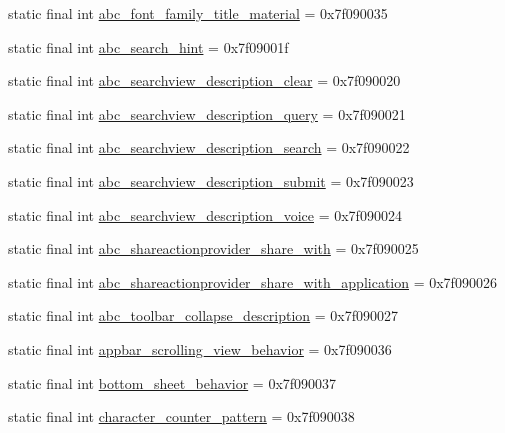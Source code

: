 \begin{CompactItemize}
\item 
static final int \hyperlink{classandroid_1_1support_1_1v4_1_1_r_1_1string_74faea8a3573e3fef71f5c119ca979ed}{abc\_\-font\_\-family\_\-title\_\-material} = 0x7f090035
\item 
static final int \hyperlink{classandroid_1_1support_1_1v4_1_1_r_1_1string_7c13299453796662989c24ebdd24002c}{abc\_\-search\_\-hint} = 0x7f09001f
\item 
static final int \hyperlink{classandroid_1_1support_1_1v4_1_1_r_1_1string_81c15c30d997ffada9693d56bdc9ca25}{abc\_\-searchview\_\-description\_\-clear} = 0x7f090020
\item 
static final int \hyperlink{classandroid_1_1support_1_1v4_1_1_r_1_1string_6de5d06d238b7fbbb99078aa9060dca0}{abc\_\-searchview\_\-description\_\-query} = 0x7f090021
\item 
static final int \hyperlink{classandroid_1_1support_1_1v4_1_1_r_1_1string_a2afff32c707ca74b2a985d2854c03b0}{abc\_\-searchview\_\-description\_\-search} = 0x7f090022
\item 
static final int \hyperlink{classandroid_1_1support_1_1v4_1_1_r_1_1string_6dd2ef27f2821ec61a831f708408d1b6}{abc\_\-searchview\_\-description\_\-submit} = 0x7f090023
\item 
static final int \hyperlink{classandroid_1_1support_1_1v4_1_1_r_1_1string_c7e3b9409a3b8e7f65dfb47fceb61cab}{abc\_\-searchview\_\-description\_\-voice} = 0x7f090024
\item 
static final int \hyperlink{classandroid_1_1support_1_1v4_1_1_r_1_1string_a91cc0a509815b7617ec57dba996e48a}{abc\_\-shareactionprovider\_\-share\_\-with} = 0x7f090025
\item 
static final int \hyperlink{classandroid_1_1support_1_1v4_1_1_r_1_1string_153823e147a2c9ec837d5109d7800f9d}{abc\_\-shareactionprovider\_\-share\_\-with\_\-application} = 0x7f090026
\item 
static final int \hyperlink{classandroid_1_1support_1_1v4_1_1_r_1_1string_c4a70aadc23f859bd386a8f790e71510}{abc\_\-toolbar\_\-collapse\_\-description} = 0x7f090027
\item 
static final int \hyperlink{classandroid_1_1support_1_1v4_1_1_r_1_1string_cbcf25457ea0777a4f5845f7aec02839}{appbar\_\-scrolling\_\-view\_\-behavior} = 0x7f090036
\item 
static final int \hyperlink{classandroid_1_1support_1_1v4_1_1_r_1_1string_9cd79d2e3ddc21874fc09bbccb3a6021}{bottom\_\-sheet\_\-behavior} = 0x7f090037
\item 
static final int \hyperlink{classandroid_1_1support_1_1v4_1_1_r_1_1string_0e8e3f8521f0255a57493cbe6e738514}{character\_\-counter\_\-pattern} = 0x7f090038

\end{CompactItemize}
